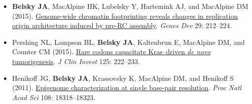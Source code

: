 
\vspace{-2mm}
\begin{resentries}

\begin{itemize}[leftmargin=!, labelindent=5pt, itemindent=-15pt, itemsep=-1.5mm]
	\item{\textbf{Belsky JA}, MacAlpine HK, Lubelsky Y, Hartemink AJ, and MacAlpine DM (2015).  \href{http://dx.doi.org/10.1101/gad.247924.114}{\color{blue} Genome-wide chromatin footprinting reveals changes in replication origin architecture induced by pre-RC assembly}.  \textit{Genes Dev} 29: 212--224.}
	\item{Pershing NL, Lampson BL, \textbf{Belsky JA}, Kaltenbrun E, MacAlpine DM, and Counter CM (2015).  \href{http://dx.doi.org/10.1172/JCI77627}{\color{blue} Rare codons capacitate Kras--driven \textit{de novo} tumorigenesis}.  \textit{J Clin Invest} 125: 222--233.}
	\item{Henikoff JG, \textbf{Belsky JA}, Krassovsky K, MacAlpine DM, and Henikoff S (2011).  \href{http://dx.doi.org/10.1073/pnas.1110731108}{\color{blue} Epigenome characterization at single base-pair resolution}.  \textit{Proc Natl Acad Sci} 108: 18318--18323.}

\end{itemize}

\end{resentries}
